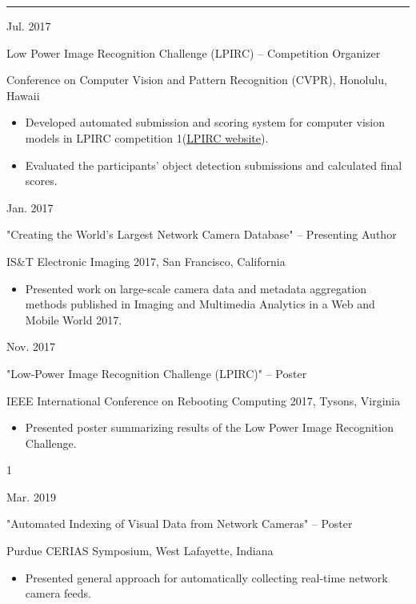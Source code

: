 \documentclass[10pt]{article}
\newlength{\cvcolumngapwidth}
\newlength{\cvleftcolumnwidth}
\newlength{\cvrightcolumnwidth}
\newcommand{\cvsectionstyle}[1]{{\normalsize\cvsectionfont\textcolor{cvsectioncolor}{#1}}}
\newcommand{\cvtitlestyle}[1]{{\large\cvtitlefont\textcolor{cvtitlecolor}{#1}}}
\newcommand{\cvdurationstyle}[1]{{\small\cvdurationfont\textcolor{cvdurationcolor}{#1}}}
\newlength{\cvafteritemskipamount}
\newlength{\cvaftersectionskipamount}
\newlength{\cvparskip}
\newcommand{\cvsection}[1]{
    \begin{minipage}[t]{\cvleftcolumnwidth}
        \raggedleft\cvsectionstyle{#1}
    \end{minipage}%
    \hspace{\cvcolumngapwidth}%
    \begin{minipage}[t]{\cvrightcolumnwidth}
        \textcolor{cvrulecolor}{\rule{\cvrightcolumnwidth}{0.3mm}}
    \end{minipage}

    \vspace{\cvaftersectionskipamount}
}
\newcommand{\cvitem}[2]{
    \begin{minipage}[t]{\cvleftcolumnwidth}
        \raggedleft #1
    \end{minipage}%
    \hspace{\cvcolumngapwidth}%
    \begin{minipage}[t]{\cvrightcolumnwidth}
        \setlength{\parskip}{\cvparskip} #2
    \end{minipage}

    \vspace{\cvafteritemskipamount}
}
\newcommand{\cvtitle}[1]{
    \cvtitlestyle{#1}

    \vspace{1mm plus 0.25mm minus 0.25mm}
    \vspace{-\cvparskip}
}
\def\online{1}
\def\cv{0}
\begin{document}
\cvsection{EXPERIENCE}

\cvitem{
    \cvdurationstyle{Jul. 2017}
}{
    \cvtitle{Low Power Image Recognition Challenge (LPIRC) – Competition Organizer}
    
    Conference on Computer Vision and Pattern Recognition (CVPR), Honolulu, Hawaii

    \begin{itemize}[leftmargin=*]
        \item Developed automated submission and scoring system for computer vision models in LPIRC competition \if\online1(\href{https://rebootingcomputing.ieee.org/lpirc}{LPIRC website})\fi.
        \item Evaluated the participants' object detection submissions and calculated final scores.
    \end{itemize}
}

\cvitem{
    \cvdurationstyle{Jan. 2017}
}{
    \cvtitle{"Creating the World’s Largest Network Camera Database" – Presenting Author}

    IS\&T Electronic Imaging 2017, San Francisco, California

    \begin{itemize}[leftmargin=*]
        \item Presented work on large-scale camera data and metadata aggregation methods published in Imaging and Multimedia Analytics in a Web and Mobile World 2017.
    \end{itemize}
}

\cvitem{
    \cvdurationstyle{Nov. 2017}
}{
    \cvtitle{"Low-Power Image Recognition Challenge (LPIRC)" – Poster}
    
    IEEE International Conference on Rebooting Computing 2017, Tysons, Virginia

    \begin{itemize}[leftmargin=*]
        \item Presented poster summarizing results of the Low Power Image Recognition Challenge.
    \end{itemize}
}

\if\cv1


\cvitem{
    \cvdurationstyle{Mar. 2019}
}{
    \cvtitle{"Automated Indexing of Visual Data from Network Cameras" – Poster}
    
    Purdue CERIAS Symposium, West Lafayette, Indiana

    \begin{itemize}[leftmargin=*]
        \item Presented general approach for automatically collecting real-time network camera feeds.
    \end{itemize}
}
\end{document}
